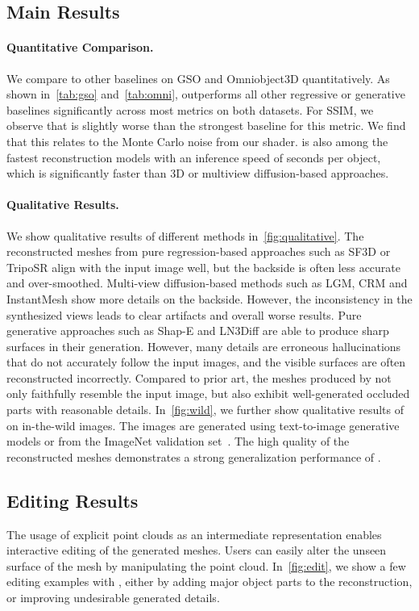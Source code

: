 \subsection{Main Results}
\paragraph{Quantitative Comparison.}
We compare \method to other baselines on GSO and Omniobject3D quantitatively. As shown in~\cref{tab:gso} and~\cref{tab:omni}, \method outperforms all other regressive or generative baselines significantly across most metrics on both datasets. For SSIM, we observe that \method is slightly worse than the strongest baseline for this metric. We find that this relates to the Monte Carlo noise from our shader. \method is also among the fastest reconstruction models with an inference speed of \gentime seconds per object, which is significantly faster than 3D or multiview diffusion-based approaches. 

\paragraph{Qualitative Results.}
We show qualitative results of different methods in~\cref{fig:qualitative}. The reconstructed meshes from pure regression-based approaches such as SF3D or TripoSR align with the input image well, but the backside is often less accurate and over-smoothed. Multi-view diffusion-based methods such as LGM, CRM and InstantMesh show more details on the backside. However, the inconsistency in the synthesized views leads to clear artifacts and overall worse results. Pure generative approaches such as Shap-E and LN3Diff are able to produce sharp surfaces in their generation. However, many details are erroneous hallucinations that do not accurately follow the input images, and the visible surfaces are often reconstructed incorrectly. Compared to prior art, the meshes produced by \method not only faithfully resemble the input image, but also exhibit well-generated occluded parts with reasonable details. In~\cref{fig:wild}, we further show qualitative results of \method on in-the-wild images. The images are generated using text-to-image generative models or from the ImageNet validation set~\cite{deng2009imagenet}. The high quality of the reconstructed meshes demonstrates a strong generalization performance of \method.

\subsection{Editing Results}
The usage of explicit point clouds as an intermediate representation enables interactive editing of the generated meshes. Users can easily alter the unseen surface of the mesh by manipulating the point cloud. In~\cref{fig:edit}, we show a few editing examples with \method, either by adding major object parts to the reconstruction, or improving undesirable generated details.

